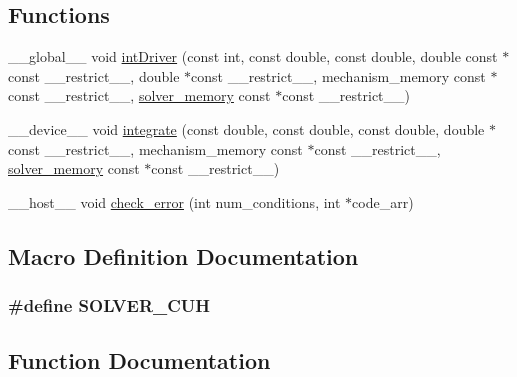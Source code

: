 \subsection*{Functions}
\begin{DoxyCompactItemize}
\item 
\+\_\+\+\_\+global\+\_\+\+\_\+ void \hyperlink{solver_8cuh_abfceb488cedffb4e9d8bc15e27749eb7}{int\+Driver} (const int, const double, const double, double const $\ast$const \+\_\+\+\_\+restrict\+\_\+\+\_\+, double $\ast$const \+\_\+\+\_\+restrict\+\_\+\+\_\+, mechanism\+\_\+memory const $\ast$const \+\_\+\+\_\+restrict\+\_\+\+\_\+, \hyperlink{structsolver__memory}{solver\+\_\+memory} const $\ast$const \+\_\+\+\_\+restrict\+\_\+\+\_\+)
\item 
\+\_\+\+\_\+device\+\_\+\+\_\+ void \hyperlink{solver_8cuh_a2b95e49f2fdc977eaaa48848b25c7297}{integrate} (const double, const double, const double, double $\ast$const \+\_\+\+\_\+restrict\+\_\+\+\_\+, mechanism\+\_\+memory const $\ast$const \+\_\+\+\_\+restrict\+\_\+\+\_\+, \hyperlink{structsolver__memory}{solver\+\_\+memory} const $\ast$const \+\_\+\+\_\+restrict\+\_\+\+\_\+)
\item 
\+\_\+\+\_\+host\+\_\+\+\_\+ void \hyperlink{solver_8cuh_ad6056d049f56791cf3459e9ee5509026}{check\+\_\+error} (int num\+\_\+conditions, int $\ast$code\+\_\+arr)
\end{DoxyCompactItemize}


\subsection{Macro Definition Documentation}
\subsubsection[{\texorpdfstring{S\+O\+L\+V\+E\+R\+\_\+\+C\+UH}{SOLVER_CUH}}]{\setlength{\rightskip}{0pt plus 5cm}\#define S\+O\+L\+V\+E\+R\+\_\+\+C\+UH}\hypertarget{solver_8cuh_aeb5114b5c03776476cc8e7689face990}{}\label{solver_8cuh_aeb5114b5c03776476cc8e7689face990}


\subsection{Function Documentation}
